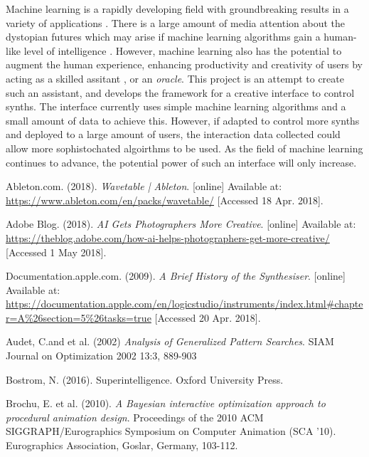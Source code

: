 \documentclass[11pt, oneside]{report}   	%
\begin{document}
{Machine learning is a rapidly developing field with groundbreaking results in a variety of applications \cite{Automation}. There is a large amount of media attention about the dystopian futures which may arise if machine learning algorithms gain a human-like level of intelligence \cite{Bostrom}. However, machine learning also has the potential to augment the human experience, enhancing productivity and creativity of users by acting as a skilled assitant \cite{AudioEffects2, AdobeBlog}, or an \emph{oracle}. This project is an attempt to create such an assistant, and develops the framework for a creative interface to control synths. The interface currently uses simple machine learning algorithms and a small amount of data to achieve this. However, if adapted to control more synths and deployed to a large amount of users, the interaction data collected could allow more sophistochated algoirthms to be used. As the field of machine learning continues to advance, the potential power of such an interface will only increase.

\begin{thebibliography}{9}
\singlespacing

Ableton.com. (2018). \emph{Wavetable | Ableton}. [online] Available at: \url{https://www.ableton.com/en/packs/wavetable/} [Accessed 18 Apr. 2018].

Adobe Blog. (2018). \emph{AI Gets Photographers More Creative}. [online] Available at: \url{https://theblog.adobe.com/how-ai-helps-photographers-get-more-creative/} [Accessed 1 May 2018].

Documentation.apple.com. (2009). \emph{A Brief History of the Synthesiser}. [online] Available at: \url{https://documentation.apple.com/en/logicstudio/instruments/index.html#chapter=A\%26section=5\%26tasks=true} [Accessed 20 Apr. 2018].

Audet, C.and et al. (2002) \emph{Analysis of Generalized Pattern Searches}.
SIAM Journal on Optimization 2002 13:3, 889-903 

Bostrom, N. (2016). Superintelligence. Oxford University Press.

Brochu, E. et al. (2010). \emph{A Bayesian interactive optimization approach to procedural animation design}. Proceedings of the 2010 ACM SIGGRAPH/Eurographics Symposium on Computer Animation (SCA '10). Eurographics Association, Goslar, Germany, 103-112.


\end{thebibliography}}
\end{document}
